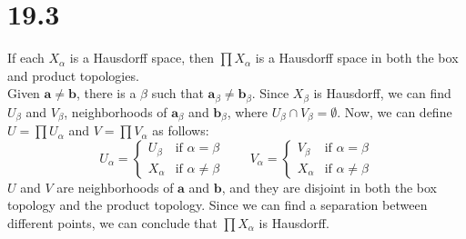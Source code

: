 \documentclass{article}
\begin{document}
\section*{19.3}
If each $X_\alpha$ is a Hausdorff space, then $\prod X_\alpha$ is a Hausdorff space in both the box and product topologies.
\\
Given $\bm{a} \neq \bm{b}$, there is a $\beta$ such that $\bm{a}_\beta \neq \bm{b}_\beta$. Since $X_\beta$ is Hausdorff, we can find $U_\beta$ and $V_\beta$, neighborhoods of $\bm{a}_\beta$ and $\bm{b}_\beta$, where $U_\beta \cap V_\beta = \emptyset$. Now, we can define $U = \prod{U_\alpha}$ and $V = \prod{V_\alpha}$ as follows:
\begin{equation*}
    U_\alpha = \begin{cases}
        U_\beta  & \text{if } \alpha = \beta \\
        X_\alpha & \text{if } \alpha \neq \beta
    \end{cases}
    \qquad
    V_\alpha = \begin{cases}
        V_\beta  & \text{if } \alpha = \beta \\
        X_\alpha & \text{if } \alpha \neq \beta
    \end{cases}
\end{equation*}
$U$ and $V$ are neighborhoods of $\bm{a}$ and $\bm{b}$, and they are disjoint in both the box topology and the product topology. Since we can find a separation between different points, we can conclude that $\prod X_\alpha$ is Hausdorff.
\end{document}
